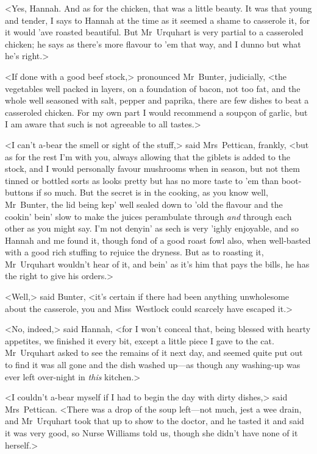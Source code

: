 <Yes, Hannah. And as for the chicken, that was a little beauty. It was that young and tender, I says to Hannah at the time as it seemed a shame to casserole it, for it would 'ave roasted beautiful. But Mr~Urquhart is very partial to a casseroled chicken; he says as there's more flavour to 'em that way, and I dunno but what he's right.>

<If done with a good beef stock,> pronounced Mr~Bunter, judicially, <the vegetables well packed in layers, on a foundation of bacon, not too fat, and the whole well seasoned with salt, pepper and paprika, there are few dishes to beat a casseroled chicken. For my own part I would recommend a soupçon of garlic, but I am aware that such is not agreeable to all tastes.>

<I can't a-bear the smell or sight of the stuff,> said Mrs~Pettican, frankly, <but as for the rest I'm with you, always allowing that the giblets is added to the stock, and I would personally favour mushrooms when in season, but not them tinned or bottled sorts as looks pretty but has no more taste to 'em than boot-buttons if so much. But the secret is in the cooking, as you know well, Mr~Bunter, the lid being kep' well sealed down to 'old the flavour and the cookin' bein' slow to make the juices perambulate through \emph{and} through each other as you might say. I'm not denyin' as sech is very 'ighly enjoyable, and so Hannah and me found it, though fond of a good roast fowl also, when well-basted with a good rich stuffing to rejuice the dryness. But as to roasting it, Mr~Urquhart wouldn't hear of it, and bein' as it's him that pays the bills, he has the right to give his orders.>

<Well,> said Bunter, <it's certain if there had been anything unwholesome about the casserole, you and Miss~Westlock could scarcely have escaped it.>

<No, indeed,> said Hannah, <for I won't conceal that, being blessed with hearty appetites, we finished it every bit, except a little piece I gave to the cat. Mr~Urquhart asked to see the remains of it next day, and seemed quite put out to find it was all gone and the dish washed up—as though any washing-up was ever left over-night in \emph{this} kitchen.>

<I couldn't a-bear myself if I had to begin the day with dirty dishes,> said Mrs~Pettican. <There was a drop of the soup left—not much, jest a wee drain, and Mr~Urquhart took that up to show to the doctor, and he tasted it and said it was very good, so Nurse Williams told us, though she didn't have none of it herself.>

